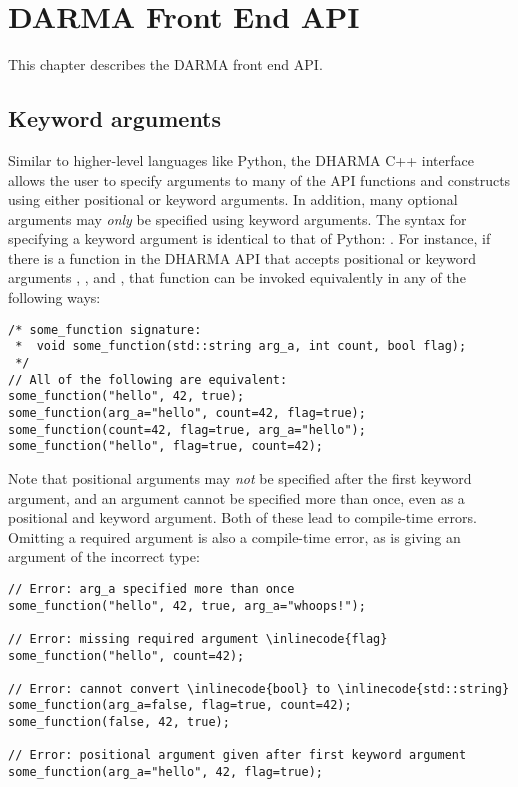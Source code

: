 \chapter{DARMA Front End API}
\label{chap:front_end}
This chapter describes the DARMA \gls{front end} \gls{API}. 

\section{Keyword arguments}
\label{sec:keyword}

Similar to higher-level languages like Python, the DHARMA C++ interface allows the user
to specify arguments to many of the API functions and constructs using either positional
or keyword arguments.  In addition, many optional arguments may {\em only} be specified using
keyword arguments.  The syntax for specifying a keyword argument is identical to that
of Python: .  For instance, if there is a function  in the
DHARMA API that accepts positional or keyword arguments , , and , that 
function can be invoked equivalently in any of the following ways:
\begin{lstlisting}
/* some_function signature:
 *  void some_function(std::string arg_a, int count, bool flag);
 */
// All of the following are equivalent:
some_function("hello", 42, true);
some_function(arg_a="hello", count=42, flag=true);
some_function(count=42, flag=true, arg_a="hello");
some_function("hello", flag=true, count=42);
\end{lstlisting}
Note that positional arguments may {\em not} be specified after the first keyword argument,
and an argument cannot be specified more than once, even as a positional and keyword
argument.  Both of these lead to compile-time errors. Omitting a required argument is 
also a compile-time error, as is giving an argument of the incorrect type: 
\begin{lstlisting}
// Error: arg_a specified more than once
some_function("hello", 42, true, arg_a="whoops!");

// Error: missing required argument \inlinecode{flag}
some_function("hello", count=42);

// Error: cannot convert \inlinecode{bool} to \inlinecode{std::string}
some_function(arg_a=false, flag=true, count=42);
some_function(false, 42, true);

// Error: positional argument given after first keyword argument
some_function(arg_a="hello", 42, flag=true);
\end{lstlisting}
